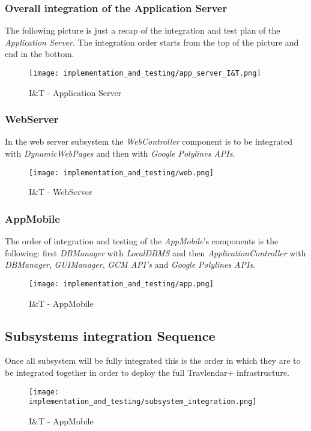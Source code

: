 \subsubsection{Overall integration of the Application Server}
The following picture is just a recap of the integration and test plan of the \textit{Application Server}. The integration order starts from the top of the picture and end in the bottom.
\begin{figure}[H]
	\begin{center}
		\texttt{[image: implementation\_and\_testing/app\_server\_I\&T.png]}
	\end{center}
	\caption{I\&T - Application Server}
\end{figure}
\newpage
\subsubsection{WebServer}
In the web server subsystem the \textit{WebController} component is to be integrated with \textit{DynamicWebPages} and then with \textit{Google Polylines APIs}. 
\begin{figure}[H]
	\begin{center}
		\texttt{[image: implementation\_and\_testing/web.png]}
	\end{center}
	\caption{I\&T - WebServer}
\end{figure}

\subsubsection{AppMobile}
The order of integration and testing of the \textit{AppMobile}'s components is the following: first \textit{DBManager} with \textit{LocalDBMS} and then \textit{ApplicationController} with \textit{DBManager}, \textit{GUIManager}, \textit{GCM API's} and \textit{Google Polylines APIs}. 
\begin{figure}[H]
	\begin{center}
		\texttt{[image: implementation\_and\_testing/app.png]}
	\end{center}
	\caption{I\&T - AppMobile}
\end{figure}
\newpage
\subsection{Subsystems integration Sequence}
Once all subsystem will be fully integrated this is the order in which they are to be integrated together in order to deploy the full Travlendar+ infrastructure.
\begin{figure}[H]
	\begin{center}
		\texttt{[image: implementation\_and\_testing/subsystem\_integration.png]}
	\end{center}
	\caption{I\&T - AppMobile}
\end{figure}